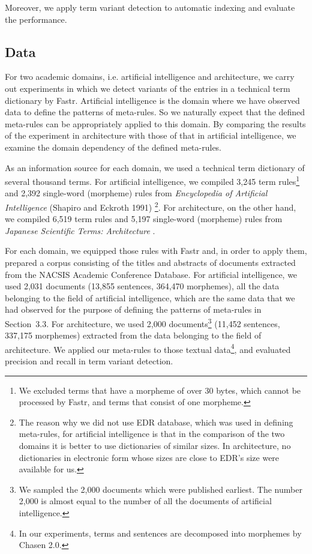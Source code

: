 Moreover, we apply term variant detection to automatic indexing and evaluate the performance.

\subsection{Data}

For two academic domains, i.e. artificial intelligence and architecture, we carry out experiments in which we detect variants of the entries in a technical term dictionary by Fastr. Artificial intelligence is the domain where we have observed data to define the patterns of meta-rules. So we naturally expect that the defined meta-rules can be appropriately applied to this domain. By comparing the results of the experiment in architecture with those of that in artificial intelligence, we examine the domain dependency of the defined meta-rules.

As an information source for each domain, we used a technical term dictionary of several thousand terms. For artificial intelligence, we compiled 3,245 term rules\footnote{We excluded terms that have a morpheme of over 30 bytes, which cannot be processed by Fastr, and terms that consist of one morpheme.} and 2,392 single-word (morpheme) rules from {\it Encyclopedia of Artificial Intelligence} (Shapiro and Eckroth 1991) \footnote{The reason why we did not use EDR database, which was used in defining meta-rules, for artificial intelligence is that in the comparison of the two domains it is better to use dictionaries of similar sizes. In architecture, no dictionaries in electronic form whose sizes are close to EDR's size were available for us.}. For architecture, on the other hand, we compiled 6,519 term rules and 5,197 single-word (morpheme) rules from {\it Japanese Scientific Terms: Architecture} \cite{Japanese}.

For each domain, we equipped those rules with Fastr and, in order to apply them, prepared a corpus consisting of the titles and abstracts of documents extracted from the NACSIS Academic Conference Database. For artificial intelligence, we used 2,031 documents (13,855 sentences, 364,470 morphemes), all the data belonging to the field of artificial intelligence, which are the same data that we had observed for the purpose of defining the patterns of meta-rules in Section~3.3. For architecture, we used 2,000 documents\footnote{We sampled the 2,000 documents which were published earliest. The number 2,000 is almost equal to the number of all the documents of artificial intelligence.} (11,452 sentences, 337,175 morphemes) extracted from the data belonging to the field of architecture. We applied our meta-rules to those textual data\footnote{In our experiments, terms and sentences are decomposed into morphemes by Chasen 2.0.}, and evaluated precision and recall in term variant detection.

